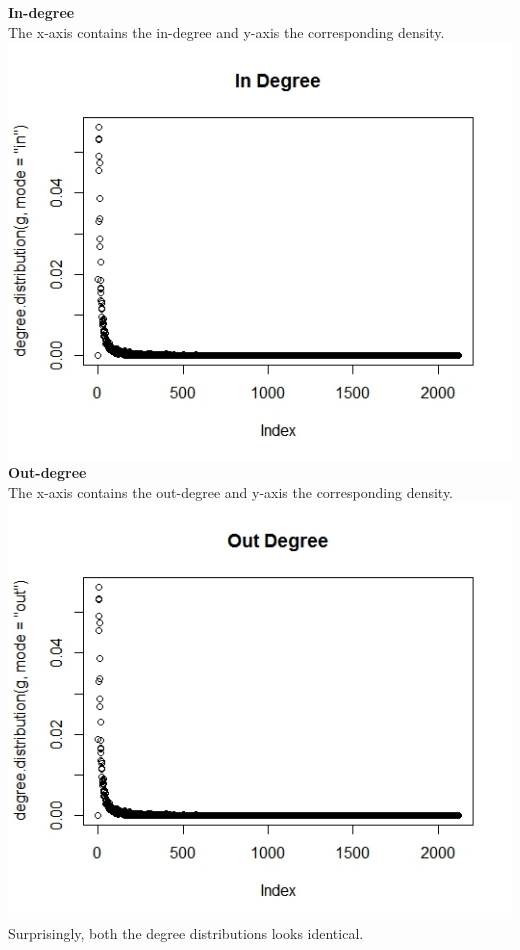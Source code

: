 \documentclass{article}
\begin{document}
\textbf{In-degree}\\
The x-axis contains the in-degree and y-axis the corresponding density.\\
\includegraphics[scale=0.4]{p1} \\
\textbf{Out-degree}\\
The x-axis contains the out-degree and y-axis the corresponding density.\\
\includegraphics[scale=0.4]{p2} \\
Surprisingly, both the degree distributions looks identical.\\
\end{document}
